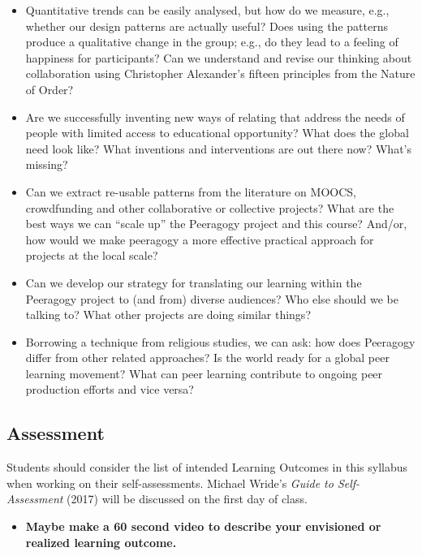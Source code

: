 \begin{itemize}
\tightlist
\item
  Quantitative trends can be easily analysed, but how do we measure,
  e.g., whether our design patterns are actually useful? Does using the
  patterns produce a qualitative change in the group; e.g., do they lead
  to a feeling of happiness for participants? Can we understand and
  revise our thinking about collaboration using Christopher Alexander's
  fifteen principles from the Nature of Order?
\item
  Are we successfully inventing new ways of relating that address the
  needs of people with limited access to educational opportunity? What
  does the global need look like? What inventions and interventions are
  out there now? What's missing?
\item
  Can we extract re-usable patterns from the literature on MOOCS,
  crowdfunding and other collaborative or collective projects? What are
  the best ways we can ``scale up'' the Peeragogy project and this
  course? And/or, how would we make peeragogy a more effective practical
  approach for projects at the local scale?
\item
  Can we develop our strategy for translating our learning within the
  Peeragogy project to (and from) diverse audiences? Who else should we
  be talking to? What other projects are doing similar things?
\item
  Borrowing a technique from religious studies, we can ask: how does
  Peeragogy differ from other related approaches? Is the world ready for
  a global peer learning movement? What can peer learning contribute to
  ongoing peer production efforts and vice versa?
\end{itemize}

\hypertarget{assessment}{%
\subsection{Assessment}\label{assessment}}

Students should consider the list of intended Learning Outcomes in this
syllabus when working on their self-assessments. Michael Wride's
\emph{Guide to Self-Assessment} (2017) will be discussed on the first
day of class.

\begin{itemize}
\tightlist
\item
  \textbf{Maybe make a 60 second video to describe your envisioned or
  realized learning outcome.}
\end{itemize}

